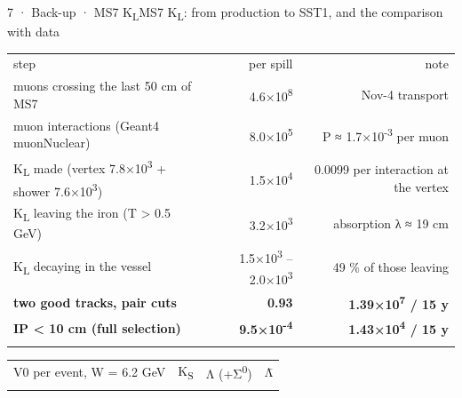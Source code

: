 \begin{btframe}{7 · Back-up · MS7 K\textsubscript{L}}{MS7 K\textsubscript{L}: from production to SST1, and the comparison with data}
\noindent \begin{minipage}[t]{\dimexpr(0.5556\linewidth-0.5556\dimexpr9.67pt\relax)}\vspace{0pt}\raggedright
{\fontsize{5.02pt}{6.52pt}\selectfont\setlength{\tabcolsep}{3.51pt}\renewcommand{\arraystretch}{1.42}
\begin{tabularx}{\linewidth}{>{\raggedright\arraybackslash}Xrr}
\textcolor{muted}{step} & \textcolor{muted}{per spill} & \textcolor{muted}{note} \\\headrule
muons crossing the last 50 cm of MS7 & 4.6×10\textsuperscript{8} & Nov-4 transport \\\rowrule
muon interactions (Geant4 muonNuclear) & 8.0×10\textsuperscript{5} & P ≈ 1.7×10\textsuperscript{-3} per muon \\\rowrule
K\textsubscript{L} made (vertex 7.8×10\textsuperscript{3} + shower 7.6×10\textsuperscript{3}) & 1.5×10\textsuperscript{4} & 0.0099 per interaction at the vertex \\\rowrule
K\textsubscript{L} leaving the iron (T > 0.5 GeV) & 3.2×10\textsuperscript{3} & absorption λ ≈ 19 cm \\\rowrule
K\textsubscript{L} decaying in the vessel & 1.5×10\textsuperscript{3} – 2.0×10\textsuperscript{3} & 49 \% of those leaving \\\rowrule
\rowcolor{tint}\bfseries two good tracks, pair cuts & \bfseries 0.93 & \bfseries 1.39×10\textsuperscript{7} / 15 y \\\rowrule
\rowcolor{tint}\bfseries IP < 10 cm (full selection) & \bfseries 9.5×10\textsuperscript{-4} & \bfseries 1.43×10\textsuperscript{4} / 15 y \\\rowrule
\end{tabularx}\par}
\end{minipage}%
\hfill%
\begin{minipage}[t]{\dimexpr(0.4444\linewidth-0.4444\dimexpr9.67pt\relax)}\vspace{0pt}\raggedright
{\fontsize{5.02pt}{6.52pt}\selectfont\setlength{\tabcolsep}{3.51pt}\renewcommand{\arraystretch}{1.42}
\begin{tabularx}{\linewidth}{>{\raggedright\arraybackslash}Xrrr}
\textcolor{muted}{V0 per event, W = 6.2 GeV} & \textcolor{muted}{K\textsubscript{S}} & \textcolor{muted}{Λ (+Σ\textsuperscript{0})} & \textcolor{muted}{Λ̄} \\\headrule

\end{tabularx}}
\end{minipage}
\end{btframe}
